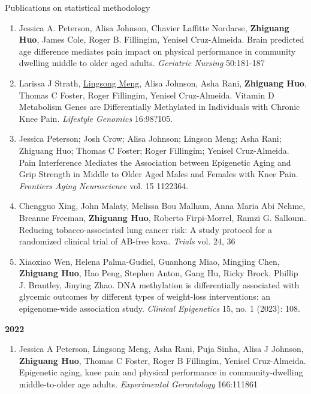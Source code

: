 \documentclass{resume} %
\begin{document}
\begin{rSection}{Publications on statistical methodology}
\begin{enumerate}[noitemsep,topsep=0pt, resume]
\item
 Jessica A. Peterson, Alisa Johnson, Chavier Laffitte Nordarse, {\bf Zhiguang Huo}, James Cole, Roger B. Fillingim, Yenisel Cruz-Almeida.
Brain predicted age difference mediates pain impact on physical performance in community dwelling middle to older aged adults.
\emph{Geriatric Nursing} 50:181-187


\item 
Larissa J Strath, \underline{Lingsong Meng}, Alisa Johnson, Asha Rani, {\bf Zhiguang Huo}, Thomas C Foster, Roger Fillingim, Yenisel Cruz-Almeida. 
Vitamin D Metabolism Genes are Differentially Methylated in Individuals with Chronic Knee Pain.
\emph{Lifestyle Genomics} 16:98?105. 

\item 
Jessica Peterson; Josh Crow; Alisa Johnson; Lingson Meng; Asha Rani; Zhiguang Huo; Thomas C Foster; Roger Fillingim; Yenisel Cruz-Almeida.
Pain Interference Mediates the Association between Epigenetic Aging and Grip Strength in Middle to Older Aged Males and Females with Knee Pain.
\emph{Frontiers Aging Neuroscience} vol. 15 1122364. 

\item 
Chengguo Xing, John Malaty, Melissa Bou Malham, Anna Maria Abi Nehme, Breanne Freeman, {\bf Zhiguang Huo}, Roberto Firpi-Morrel, Ramzi G. Salloum. 
Reducing tobacco-associated lung cancer risk: A study protocol for a randomized clinical trial of AB-free kava.
\emph{Trials} vol. 24, 36

\item 
Xiaoxiao Wen, Helena Palma-Gudiel, Guanhong Miao, Mingjing Chen, {\bf Zhiguang Huo}, Hao Peng, Stephen Anton, Gang Hu, Ricky Brock, Phillip J. Brantley, Jinying Zhao.
DNA methylation is differentially associated with glycemic outcomes by different types of weight-loss interventions: an epigenome-wide association study. 
\emph{Clinical Epigenetics} 15, no. 1 (2023): 108.
\label{bioinfo_32} 



\end{enumerate}


\textbf{2022}
\begin{enumerate}[noitemsep,topsep=0pt, resume]

\item
Jessica A Peterson, Lingsong Meng, Asha Rani, Puja Sinha, Alisa J Johnson, {\bf Zhiguang Huo}, Thomas C Foster, Roger B Fillingim, Yenisel Cruz-Almeida.
Epigenetic aging, knee pain and physical performance in community-dwelling middle-to-older age adults.
\emph{Experimental Gerontology} 166:111861



\end{enumerate}
\end{rSection}
\end{document}
